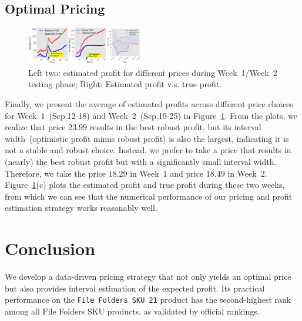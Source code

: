 \documentclass[competition,nonblindrev, 12pt]{informs3-competition}
\theoremstyle{TH}%
\theoremstyle{TH}%
\begin{document}
\subsection{Optimal Pricing}
\begin{figure}
\vspace{-4em}
\centering
\includegraphics[width=0.45\textwidth]{Pricing_summary.pdf}
 \caption{Left two: estimated profit for different prices during Week~1/Week~2 testing phase; Right: Estimated profit v.s. true profit.}
 \vspace{-2em}
\label{fig:profit:summary}
\end{figure}
Finally, we present the average of estimated profits across different price choices for Week~1~(Sep.12-18) and Week~2~(Sep.19-25) in Figure~\ref{fig:profit:summary}.
From the plots, we realize that price $23.99$ results in the best robust profit, but its interval width~(optimistic profit minus robust profit) is also the largest, indicating it is not a stable and robust choice.
Instead, we prefer to take a price that results in (nearly) the best robust profit but with a significantly small interval width. 
Therefore, we take the price $18.29$ in Week~1 and price $18.49$ in Week~2.
Figure~\ref{fig:profit:summary}(c) plots the estimated profit and true profit during these two weeks, from which we can see that the numerical performance of our pricing and profit estimation strategy works reasonably well.






\vspace{-1em}
\section{Conclusion}
We develop a data-driven pricing strategy that not only yields an optimal price but also provides interval estimation of the expected profit.
Its practical performance on the \texttt{File Folders SKU 21} product has the second-highest rank among all File Folders SKU products, as validated by official rankings.
\end{document}
